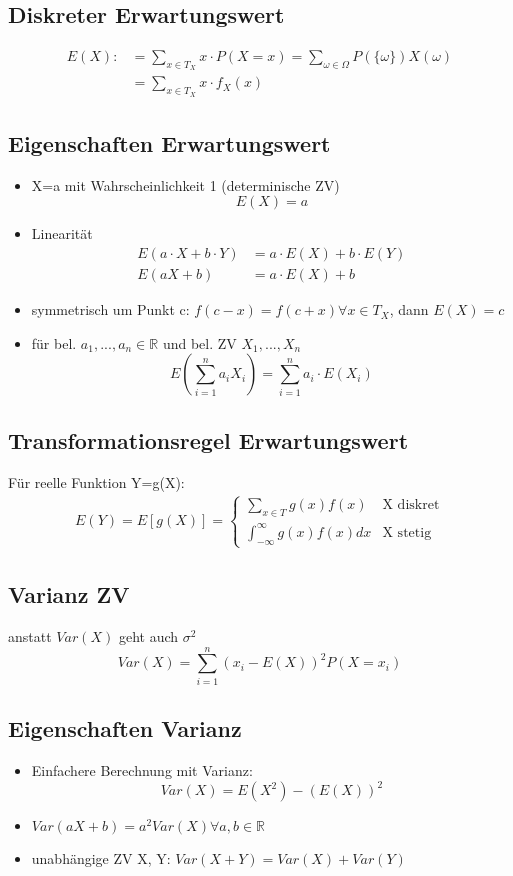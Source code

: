 \documentclass[10pt,a4paper,landscape]{article}
\begin{document}
\begin{multicols}{4}
\subsection{Diskreter Erwartungswert}
\begin{align*}
E(X) :&=\sum_{x\in T_X} x\cdot P(X=x) = \sum_{\omega \in \Omega} P(\{\omega\})X(\omega) \\
&= \sum_{x\in T_X} x\cdot f_X(x)
\end{align*}

\subsection{Eigenschaften Erwartungswert}
\begin{itemize}
\item X=a mit Wahrscheinlichkeit 1 (determinische ZV)
\[
E(X)=a
\]
\item Linearität
\begin{align*}
E(a\cdot X + b \cdot Y) &= a\cdot E(X) + b \cdot	E(Y) \\
E(aX+b) &= a\cdot E(X) + b
\end{align*}
\item symmetrisch um Punkt c: $f(c-x)=f(c+x) \forall x \in T_X$, dann $E(X)=c$
\item für bel. $a_1,...,a_n \in \mathbb{R}$ und bel. ZV $X_1,...,X_n$
\[
E\left(\sum_{i=1}^na_iX_i\right)=\sum_{i=1}^na_i \cdot E(X_i)
\]
\end{itemize}

\subsection{Transformationsregel Erwartungswert}
Für reelle Funktion Y=g(X):
\begin{align*}
E(Y)=E[g(X)]=\begin{cases}
\sum_{x\in T}g(x)f(x) &\text{X diskret} \\
\int_{-\infty}^{\infty}g(x)f(x)dx &\text{X stetig}
\end{cases}
\end{align*}

\subsection{Varianz ZV}
anstatt $Var(X)$ geht auch $\sigma^2$
\[
Var(X) = \sum_{i=1}^n (x_i - E(X))^2P(X=x_i)
\]

\subsection*{Eigenschaften Varianz}
\begin{itemize}
\item Einfachere Berechnung mit Varianz:
\[
Var(X)=E(X^2)-(E(X))^2
\]
\item $Var(aX+b)=a^2Var(X) \forall a,b \in \mathbb{R}$
\item unabhängige ZV X, Y: $Var(X+Y)=Var(X)+Var(Y)$
\end{itemize}


\end{multicols}
\end{document}
